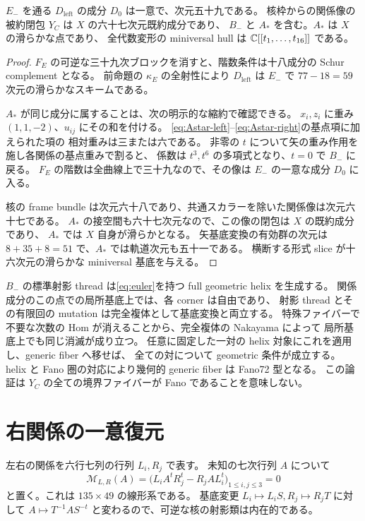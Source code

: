 \begin{proposition}[六十七次元成分と十六次元変形基底]\label{prop:component}
$E_-$ を通る $D_{\mathrm{left}}$ の成分 $D_0$ は一意で、次元五十九である。
核枠からの関係像の被約閉包 $Y_C$ は $X$ の六十七次元既約成分であり、
$B_-$ と $A_*$ を含む。$A_*$ は $X$ の滑らかな点であり、
全代数変形の miniversal hull は $\mathbb C[[t_1,\ldots,t_{16}]]$ である。
\end{proposition}
\begin{proof}
$F_E$ の可逆な三十九次ブロックを消すと、階数条件は十八成分の Schur complement となる。
前命題の $\kappa_E$ の全射性により $D_{\mathrm{left}}$ は $E_-$ で
$77-18=59$ 次元の滑らかなスキームである。

$A_*$ が同じ成分に属することは、次の明示的な縮約で確認できる。
$x_i,z_i$ に重み $(1,1,-2)$、$u_{ij}$ にその和を付ける。
\eqref{eq:Astar-left}--\eqref{eq:Astar-right}の基点項に加えられた項の
相対重みは三または六である。
非零の $t$ について矢の重み作用を施し各関係の基点重みで割ると、
係数は $t^3,t^6$ の多項式となり、$t=0$ で $B_-$ に戻る。
$F_E$ の階数は全曲線上で三十九なので、その像は $E_-$ の一意な成分 $D_0$ に入る。

核の frame bundle は次元六十八であり、共通スカラーを除いた関係像は次元六十七である。
$A_*$ の接空間も六十七次元なので、この像の閉包は $X$ の既約成分であり、
$A_*$ では $X$ 自身が滑らかとなる。
矢基底変換の有効群の次元は $8+35+8=51$ で、$A_*$ では軌道次元も五十一である。
横断する形式 slice が十六次元の滑らかな miniversal 基底を与える。
\end{proof}

\begin{remark}
$B_-$ の標準射影 thread は\eqref{eq:euler}を持つ full geometric helix を生成する\cite{LO}。
関係成分のこの点での局所基底上では、各 corner は自由であり、
射影 thread とその有限回の mutation は完全複体として基底変換と両立する。
特殊ファイバーで不要な次数の Hom が消えることから、完全複体の Nakayama によって
局所基底上でも同じ消滅が成り立つ。
任意に固定した一対の helix 対象にこれを適用し、generic fiber へ移せば、
全ての対について geometric 条件が成立する。
helix と Fano 圏の対応\cite{BP,ELO}により幾何的 generic fiber は Fano72 型となる。
この論証は $Y_C$ の全ての境界ファイバーが Fano であることを意味しない。
\end{remark}

\section{右関係の一意復元}
\label{sec:right-reconstruction}
左右の関係を六行七列の行列 $L_i,R_j$ で表す。
未知の七次行列 $A$ について
\begin{equation}\label{eq:recover}
 \mathcal M_{L,R}(A)
 =\bigl(L_iA^tR_j^t-R_jAL_i^t\bigr)_{1\le i,j\le3}=0
\end{equation}
と置く。これは $135\times49$ の線形系である。
基底変更 $L_i\mapsto L_iS,R_j\mapsto R_jT$ に対して
$A\mapsto T^{-1}AS^{-t}$ と変わるので、可逆な核の射影類は内在的である。

